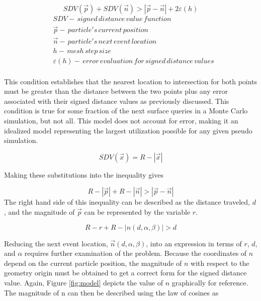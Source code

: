 \begin{equation}
  SDV(\vec{p}) + SDV(\vec{n}) > |\vec{p}-\vec{n}| + 2\varepsilon(h)
  \label{eq:condition_no_error}
\end{equation}
\begin{align*}
 &SDV - \, signed \, distance \, value \, function \\
 &\vec{p} - \, particle's \, current \, position \\
 &\vec{n} - \, particle's \, next \, event \, location \\
 &h - \, mesh \, step \, size \\
 &\varepsilon(h) - \, error \, evaluation \, for \, signed \, distance \, values \\
\end{align*}

This condition establishes that the nearest location to intersection for both
points must be greater than the distance between the two points plus any error
associated with their signed distance values as previously discussed. This
condition is true for some fraction of the next surface queries in a Monte Carlo
simulation, but not all.  This model does not account for error, making it an
idealized model representing the largest utilization possible for any given
pseudo simulation.

\begin{equation}
SDV(\vec{x}) =  R-|\vec{x}|
\end{equation}

Making these substitutions into the inequality gives

\begin{equation}
R-|\vec{p}| + R - |\vec{n}| >   |\vec{p}-\vec{n}|
\end{equation}
The right hand side of this inequality can be described as the distance
traveled, $d$, and the magnitude of $\vec{p}$ can be represented
by the variable $r$.

\begin{equation}
 R-r + R - |n(d,\alpha,\beta)| > d
\end{equation}

Reducing the next event location, $\vec{n}(d,\alpha,\beta)$, into an expression
in terms of $r$, $d$, and $\alpha$ requires further examination of the
problem. Because the coordinates of $n$ depend on the current particle position,
the magnitude of $n$ with respect to the geometry origin must be obtained to get
a correct form for the signed distance value. Again,  Figure \ref{fig:model} depicts the
value of $n$ graphically for reference. The magnitude of n can then be described
using the law of cosines as

